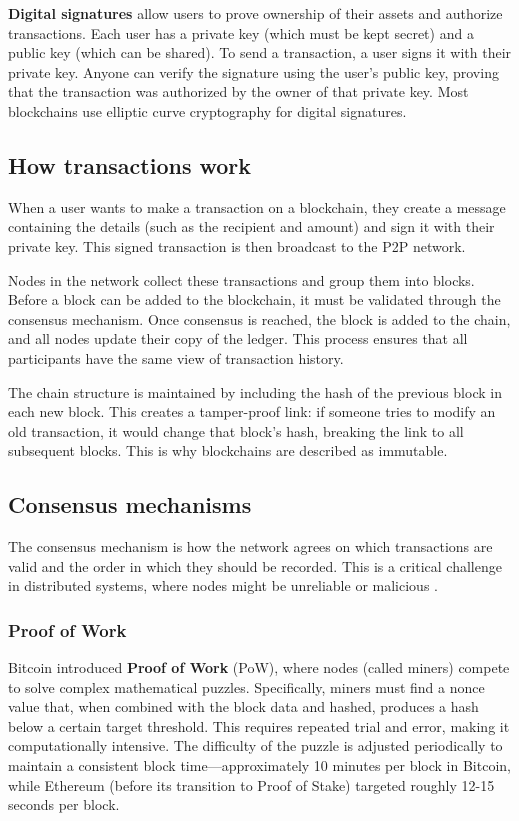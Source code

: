\textbf{Digital signatures} allow users to prove ownership of their assets and authorize transactions. Each user has a private key (which must be kept secret) and a public key (which can be shared). To send a transaction, a user signs it with their private key. Anyone can verify the signature using the user's public key, proving that the transaction was authorized by the owner of that private key. Most blockchains use elliptic curve cryptography for digital signatures.

\subsection{How transactions work}
When a user wants to make a transaction on a blockchain, they create a message containing the details (such as the recipient and amount) and sign it with their private key. This signed transaction is then broadcast to the P2P network.

Nodes in the network collect these transactions and group them into blocks. Before a block can be added to the blockchain, it must be validated through the consensus mechanism. Once consensus is reached, the block is added to the chain, and all nodes update their copy of the ledger. This process ensures that all participants have the same view of transaction history.

The chain structure is maintained by including the hash of the previous block in each new block. This creates a tamper-proof link: if someone tries to modify an old transaction, it would change that block's hash, breaking the link to all subsequent blocks. This is why blockchains are described as immutable.

\subsection{Consensus mechanisms}
The consensus mechanism is how the network agrees on which transactions are valid and the order in which they should be recorded. This is a critical challenge in distributed systems, where nodes might be unreliable or malicious \cite{antonopoulos2018mastering}.

\subsubsection{Proof of Work}
Bitcoin introduced \textbf{Proof of Work} (PoW), where nodes (called miners) compete to solve complex mathematical puzzles. Specifically, miners must find a nonce value that, when combined with the block data and hashed, produces a hash below a certain target threshold. This requires repeated trial and error, making it computationally intensive. The difficulty of the puzzle is adjusted periodically to maintain a consistent block time—approximately 10 minutes per block in Bitcoin, while Ethereum (before its transition to Proof of Stake) targeted roughly 12-15 seconds per block.

